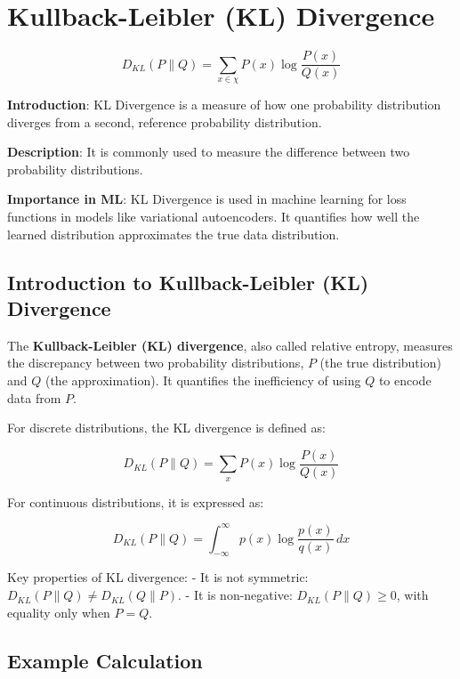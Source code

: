 \documentclass[
  12 pt,
  a4paper,
]{book}
\numberwithin{equation}{section}
\theoremstyle{plain}      %
\theoremstyle{definition} %
\theoremstyle{remark}     %
\theoremstyle{note}         %
\begin{document}
\newpage

\hypertarget{kullback-leibler-kl-divergence}{%
\chapter{Kullback-Leibler (KL)
Divergence}\label{kullback-leibler-kl-divergence}}

\[
D_{KL}(P \| Q) = \sum_{x \in \chi} P(x) \log \frac{P(x)}{Q(x)}
\]

\textbf{Introduction}: KL Divergence is a measure of how one probability
distribution diverges from a second, reference probability distribution.

\textbf{Description}: It is commonly used to measure the difference
between two probability distributions.

\textbf{Importance in ML}: KL Divergence is used in machine learning for
loss functions in models like variational autoencoders. It quantifies
how well the learned distribution approximates the true data
distribution.

\newpage

\hypertarget{introduction-to-kullback-leibler-kl-divergence}{%
\section{Introduction to Kullback-Leibler (KL)
Divergence}\label{introduction-to-kullback-leibler-kl-divergence}}

The \textbf{Kullback-Leibler (KL) divergence}, also called relative
entropy, measures the discrepancy between two probability distributions,
\(P\) (the true distribution) and \(Q\) (the approximation). It
quantifies the inefficiency of using \(Q\) to encode data from \(P\).

For discrete distributions, the KL divergence is defined as:

\[
D_{KL}(P \| Q) = \sum_{x} P(x) \log \frac{P(x)}{Q(x)}
\]

For continuous distributions, it is expressed as:

\[
D_{KL}(P \| Q) = \int_{-\infty}^\infty p(x) \log \frac{p(x)}{q(x)} \, dx
\]

Key properties of KL divergence: - It is not symmetric:
\(D_{KL}(P \| Q) \neq D_{KL}(Q \| P)\). - It is non-negative:
\(D_{KL}(P \| Q) \geq 0\), with equality only when \(P = Q\).

\hypertarget{example-calculation}{%
\section{Example Calculation}\label{example-calculation}}
\end{document}
